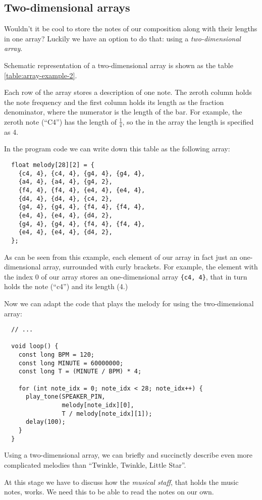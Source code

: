 \documentclass[../sparc.tex]{subfiles}
\begin{document}
\newpage
\subsection{Two-dimensional arrays}

Wouldn't it be cool to store the notes of our composition along with their
lengths in one array?  Luckily we have an option to do that: using a
\emph{two-dimensional array}.

Schematic representation of a two-dimensional array is shown as the table
\ref{table:array-example-2}.


Each row of the array stores a description of one note.  The zeroth column holds
the note frequency and the first column holds its length as the fraction
denominator, where the numerator is the length of the bar.  For example, the
zeroth note (``C4'') has the length of $\frac{1}{4}$, so the in the array the
length is specified as 4.

In the program code we can write down this table as the following array:

\begin{verbatim}
  float melody[28][2] = {
    {c4, 4}, {c4, 4}, {g4, 4}, {g4, 4},
    {a4, 4}, {a4, 4}, {g4, 2},
    {f4, 4}, {f4, 4}, {e4, 4}, {e4, 4},
    {d4, 4}, {d4, 4}, {c4, 2},
    {g4, 4}, {g4, 4}, {f4, 4}, {f4, 4},
    {e4, 4}, {e4, 4}, {d4, 2},
    {g4, 4}, {g4, 4}, {f4, 4}, {f4, 4},
    {e4, 4}, {e4, 4}, {d4, 2},
  };
\end{verbatim}

As can be seen from this example, each element of our array in fact just an
one-dimensional array, surrounded with curly brackets.  For example, the element
with the index 0 of our array stores an one-dimensional array \texttt{\{c4,
 4\}}, that in turn holds the note (``c4'') and its length (4.)

Now we can adapt the code that plays the melody for using the two-dimensional
array:

\begin{verbatim}
  // ...

  void loop() {
    const long BPM = 120;
    const long MINUTE = 60000000;
    const long T = (MINUTE / BPM) * 4;

    for (int note_idx = 0; note_idx < 28; note_idx++) {
      play_tone(SPEAKER_PIN,
                melody[note_idx][0],
                T / melody[note_idx][1]);
      delay(100);
    }
  }
\end{verbatim}

Using a two-dimensional array, we can briefly and succinctly describe even more
complicated melodies than ``Twinkle, Twinkle, Little Star''.

At this stage we have to discuss how the \emph{musical staff}, that holds the
music notes, works.  We need this to be able to read the notes on our own.
\end{document}
